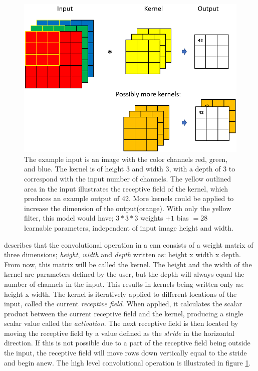     \begin{figure}[H]
        \centering
        \includegraphics[scale=0.4]{figures/convolution.png}
        \caption[Convolutional operation example]{The example input is an image with the color channels red, green, and blue. The kernel is of height 3 and width 3, with a depth of 3 to correspond with the input number of channels. The yellow outlined area in the input illustrates the receptive field of the kernel, which produces an example output of 42. More kernels could be applied to increase the dimension of the output(orange). With only the yellow filter, this model would have; $3*3*3$ weights $+ 1$ bias $= 28$ learnable parameters, independent of input image height and width.}
      	\medskip 
        \label{convolutional_high_level_fig}
    \end{figure}
    
     
    
    
     \citeauthor{o2015introduction_convolutions}\cite{o2015introduction_convolutions} describes that the convolutional operation in a \gls{cnn} consists of a weight matrix of three dimensions; \textit{height}, \textit{width} and \textit{depth} written as: height x width x depth. From now, this matrix will be called the kernel. The height and the width of the kernel are parameters defined by the user, but the depth will always equal the number of channels in the input. This results in kernels being written only as: height x width.  The kernel is iteratively applied to different locations of the input, called the current \textit{receptive field}. When applied, it calculates the scalar product between the current receptive field and the kernel, producing a single scalar value called the \textit{activation}. The next receptive field is then located by moving the receptive field by a value defined as the \textit{stride} in the horizontal direction. If this is not possible due to a part of the  receptive field being outside the input, the receptive field will move rows down vertically equal to the stride and begin anew. The high level convolutional operation is illustrated in figure \ref{convolutional_high_level_fig}.
    
